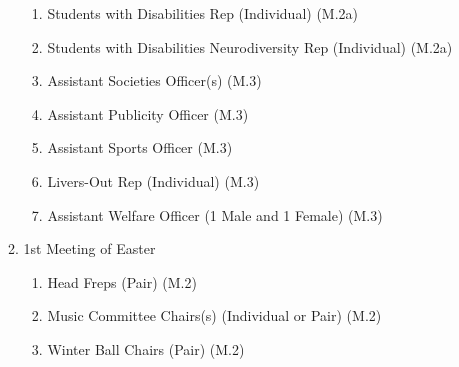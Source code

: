 \begin{enumerate}
\begin{enumerate}
\begin{enumerate}
            \item Students with Disabilities Rep (Individual) (M.2a)
            \item Students with Disabilities Neurodiversity Rep  (Individual) (M.2a)
            \item Assistant Societies Officer(s) (M.3)
            \item Assistant Publicity Officer (M.3)
            \item Assistant Sports Officer (M.3)
            \item Livers-Out Rep (Individual) (M.3)
            \item Assistant Welfare Officer (1 Male and 1 Female) (M.3)
        \end{enumerate}
        \item 1st Meeting of Easter
        \begin{enumerate}
            \item Head Freps (Pair) (M.2)
            \item Music Committee Chairs(s) (Individual or Pair) (M.2)
            \item Winter Ball Chairs (Pair) (M.2)
            

\end{enumerate}
\end{enumerate}
\end{enumerate}
